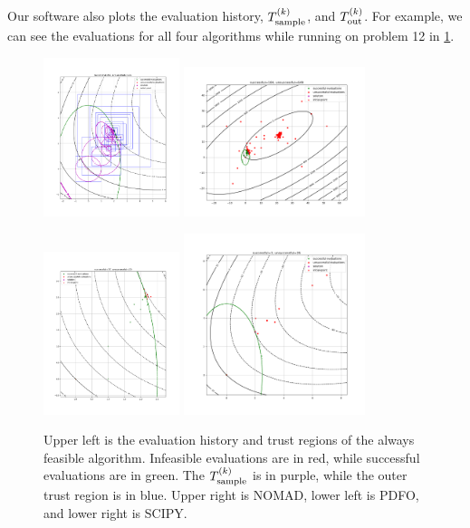 Our software also plots the evaluation history, ${T_{\text{sample}}^{(k)}}$, and ${T_{\text{out}}^{(k)}}$.
For example, we can see the evaluations for all four algorithms while running on problem 12 in \cref{example_history_plot}.


\begin{figure}[ht]
    \centering
    \includegraphics[width=150px]{images/12_always_feasible_no_params.png}
    \includegraphics[width=200px]{images/12_nomad_no_params.png}
    
    \includegraphics[width=150px]{images/12_pdfo_no_params.png}
    \includegraphics[width=200px]{images/12_scipy_no_params.png}
    \caption[Evaluation histories for problem 12.]{
    	Upper left is the evaluation history and trust regions of the always feasible algorithm.
    	Infeasible evaluations are in red, while successful evaluations are in green.
    	The ${T_{\text{sample}}^{(k)}}$ is in purple, while the outer trust region is in blue.
    	Upper right is NOMAD, lower left is PDFO, and lower right is SCIPY.
	}
    \label{example_history_plot}
\end{figure}

